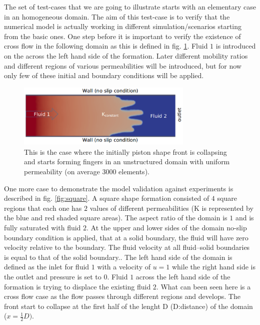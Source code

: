 \documentclass[preprint,authoryear,12pt]{elsarticle}
\begin{document}
The set of test-cases that we are going to illustrate starts with an elementary case in an homogeneous domain. The aim of this test-case is to verify that the numerical model is actually working in different simulation/scenarios starting from the basic ones. One step before it is important to verify the existence of cross flow in the following domain as this is defined in fig. \ref{fig:simple_case}. Fluid $1$ is introduced on the  across the left hand side of the formation. Later different mobility ratios and different regions of various permeabilities will be introduced, but for now only few of these initial and boundary conditions will be applied. 

\begin{figure}[h]
\begin{center}
\includegraphics[width=0.75\textwidth]{./Pics/phase_vol_frac_uni_perm_1.pdf}
\caption{This is the case where the initially piston shape front is collapsing and starts forming fingers in an unstructured domain with uniform permeability (on average 3000 elements).}
\label{fig:simple_case}
\end{center}
\end{figure}

One more case to demonstrate the model validation against experiments is described in fig. \ref{fig:square}. A square shape formation consisted of $4$ square regions that each one has $2$ values of different permeabilities (K is represented by the blue and red shaded square areas). The aspect ratio of the domain is $1$ and is fully saturated with fluid $2$. At the upper and lower sides of the domain no-slip boundary condition is applied, that at a solid boundary, the fluid will have zero velocity relative to the boundary. The fluid velocity at all fluid–solid boundaries is equal to that of the solid boundary.. The left hand side of the domain is defined as the inlet for fluid $1$ with a velocity of $u=1$ while the right hand side is the outlet and pressure is set to $0$. Fluid $1$ across the left hand side of the formation is trying to displace the existing fluid $2$. What can been seen here is a cross flow case as the flow passes through different regions and develops. The front start to collapse at the first half of the lenght D (D:distance) of the domain ($x= \frac{1}{2} D)$.
\end{document}
